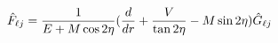 \begin{equation}
\label{FG}
\hat F_{\ell j}={1\over {E+M\cos 2\eta}}({d\over dr}+{V\over \tan 2\eta}-
M\sin 2\eta)\hat G_{\ell j}
\end{equation}


